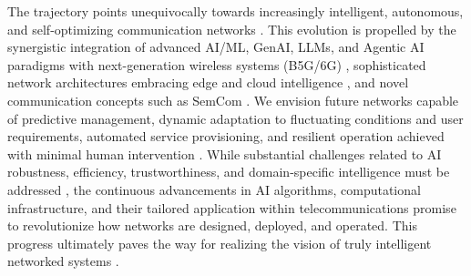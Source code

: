 \documentclass[sigconf]{acmart}
\begin{document}
The trajectory points unequivocally towards increasingly intelligent, autonomous, and self-optimizing communication networks \cite{ref9, ref12, ref17, ref26, ref31}. This evolution is propelled by the synergistic integration of advanced AI/ML, GenAI, LLMs, and Agentic AI paradigms \cite{ref9, ref35} with next-generation wireless systems (B5G/6G) \cite{ref1, ref6, ref12, ref17}, sophisticated network architectures embracing edge and cloud intelligence \cite{ref3, ref13, ref31}, and novel communication concepts such as SemCom \cite{ref24, ref34}. We envision future networks capable of predictive management, dynamic adaptation to fluctuating conditions and user requirements, automated service provisioning, and resilient operation achieved with minimal human intervention \cite{ref9, ref15, ref35}. While substantial challenges related to AI robustness, efficiency, trustworthiness, and domain-specific intelligence must be addressed \cite{ref7, ref9, ref12, ref21, ref26}, the continuous advancements in AI algorithms, computational infrastructure, and their tailored application within telecommunications promise to revolutionize how networks are designed, deployed, and operated. This progress ultimately paves the way for realizing the vision of truly intelligent networked systems \cite{ref13, ref32}.

 



\end{document}
